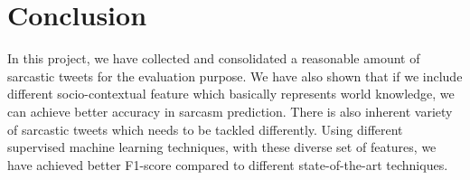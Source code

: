 \section{Conclusion}
\label{sec:conclusion}
In this project, we have collected and consolidated a reasonable amount of sarcastic tweets for the evaluation purpose. We have also shown that if we include different socio-contextual feature which basically represents world knowledge, we can achieve better accuracy in sarcasm prediction. There is also inherent variety of sarcastic tweets which needs to be tackled differently. Using different supervised machine learning techniques, with these diverse set of features, we have achieved better F1-score compared to different state-of-the-art techniques.